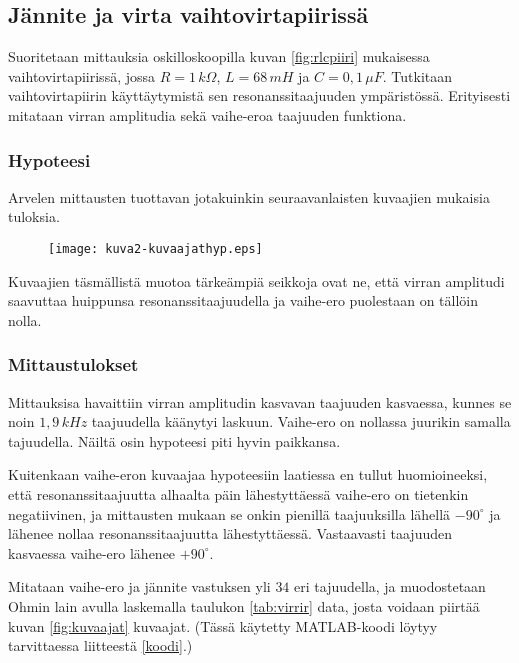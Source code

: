 \documentclass[a4paper,11pt]{article}
\begin{document}
{\subsection{Jännite ja virta vaihtovirtapiirissä}

Suoritetaan mittauksia oskilloskoopilla kuvan \ref{fig:rlcpiiri} mukaisessa vaihtovirtapiirissä, jossa $R=1\,k\Omega$, $L=68\,mH$ ja $C=0,1\,\mu F$. Tutkitaan vaihtovirtapiirin käyttäytymistä sen resonanssitaajuuden ympäristössä. Erityisesti mitataan virran amplitudia sekä vaihe-eroa taajuuden funktiona.

\subsubsection{Hypoteesi}

Arvelen mittausten tuottavan jotakuinkin seuraavanlaisten kuvaajien mukaisia tuloksia.

\begin{figure}[!htb]
    \centering
    \texttt{[image: kuva2-kuvaajathyp.eps]}
\end{figure}

Kuvaajien täsmällistä muotoa tärkeämpiä seikkoja ovat ne, että virran amplitudi saavuttaa huippunsa resonanssitaajuudella ja vaihe-ero puolestaan on tällöin nolla.

\subsubsection{Mittaustulokset}
\label{mittitti}

Mittauksisa havaittiin virran amplitudin kasvavan taajuuden kasvaessa, kunnes se noin $1,9\,kHz$ taajuudella käänytyi laskuun. Vaihe-ero on nollassa juurikin samalla tajuudella. Näiltä osin hypoteesi piti hyvin paikkansa.

Kuitenkaan vaihe-eron kuvaajaa hypoteesiin laatiessa en tullut huomioineeksi, että resonanssitaajuutta alhaalta päin lähestyttäessä vaihe-ero on tietenkin negatiivinen, ja mittausten mukaan se onkin pienillä taajuuksilla lähellä $-90^{\circ}$ ja lähenee nollaa resonanssitaajuutta lähestyttäessä. Vastaavasti taajuuden kasvaessa vaihe-ero lähenee $+90^{\circ}$.

Mitataan vaihe-ero ja jännite vastuksen yli $34$ eri tajuudella, ja muodostetaan Ohmin lain avulla laskemalla taulukon \ref{tab:virrir} data, josta voidaan piirtää kuvan \ref{fig:kuvaajat} kuvaajat. (Tässä käytetty MATLAB-koodi löytyy tarvittaessa liitteestä \ref{koodi}.)

}
\end{document}
